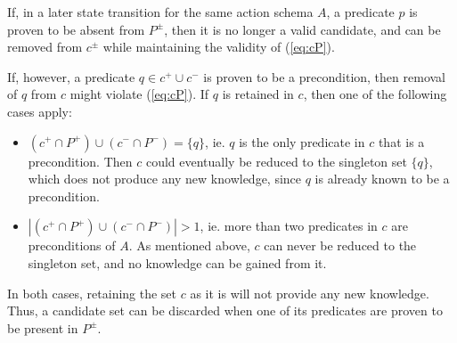 \documentclass[../master.tex]{subfiles}
\begin{document}
If, in a later state transition for the same action schema $A$, a predicate $p$
is proven to be absent from $P^{\pm}$, then it is no longer a valid candidate,
and can be removed from $c^{\pm}$ while maintaining the validity of
(\ref{eq:cP}).

If, however, a predicate $q\in c^{+}\cup c^{-}$ is proven to be a precondition,
then removal of $q$ from $c$ might violate (\ref{eq:cP}). If $q$ is retained in
$c$, then one of the following cases apply: \begin{itemize} \item
$\left(c^{+}\cap P^{+}\right)\cup\left(c^{-}\cap P^{-}\right)=\{q\}$, ie. $q$ is
the only predicate in $c$ that is a precondition. Then $c$ could eventually be
reduced to the singleton set $\{q\}$, which does not produce any new knowledge,
since $q$ is already known to be a precondition. \item $\left|\left(c^{+}\cap
P^{+}\right)\cup\left(c^{-}\cap P^{-}\right)\right|>1$, ie. more than two
predicates in $c$ are preconditions of $A$. As mentioned above, $c$ can never be
reduced to the singleton set, and no knowledge can be gained from it.
\end{itemize} In both cases, retaining the set $c$ as it is will not provide any
new knowledge. Thus, a candidate set can be discarded when one of its predicates
are proven to be present in $P^{\pm}$.
\end{document}
